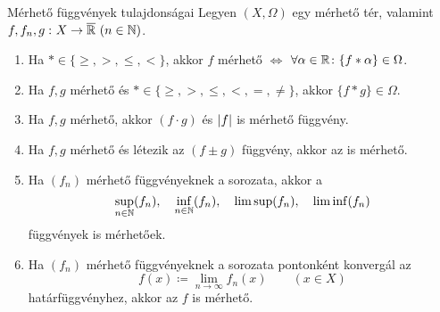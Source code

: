 \documentclass[
]{elteikthesis}[2024/04/26]
\begin{document}
	\newpage
	\begin{theorem}{Mérhető függvények tulajdonságai}{}
		Legyen \( (X, \Omega) \) egy mérhető tér, 
		valamint \( f, f_n, g \,\colon X \to \overline{\mathbb{R}} \ (n \in \mathbb{N}) \).
		\begin{enumerate}
			\item 
			Ha \( * \in \{ \geq, >, \leq, < \} \),
			akkor \( f \) mérhető \( \iff \) 
			\( \forall \alpha \in \mathbb{R} \colon \{ f * \alpha \} \in \Omega \).
			
			\item
			Ha \( f, g \) mérhető és \( * \in \{ \geq, >, \leq, <, =, \neq \} \), 
			akkor \( \{ f * g \} \in \Omega \).
			
			\item
			Ha \( f, g \) mérhető, akkor \( (f \cdot g) \) és \( \abs{f} \) is mérhető függvény.
			
			\item
			Ha \( f, g \) mérhető és létezik az \( (f \pm g) \) függvény, akkor az is mérhető.
			
			\item
			Ha \( (f_n) \) mérhető függvényeknek a sorozata, akkor a
			\[
				\sup_{n \in \mathbb{N}}(f_n), \quad
				\inf_{n \in \mathbb{N}}(f_n), \quad
				\limsup(f_n), \quad
				\liminf(f_n)
			\]
			függvények is mérhetőek.
			
			\item
			Ha \( (f_n) \) mérhető függvényeknek a sorozata pontonként konvergál az
			\[
				f(x) \coloneq \lim_{n \to \infty} f_n(x) \qquad (x \in X)
			\]
			határfüggvényhez, akkor az \( f \) is mérhető.
		\end{enumerate}
	\end{theorem}
	
	\newpage
	
\end{document}

